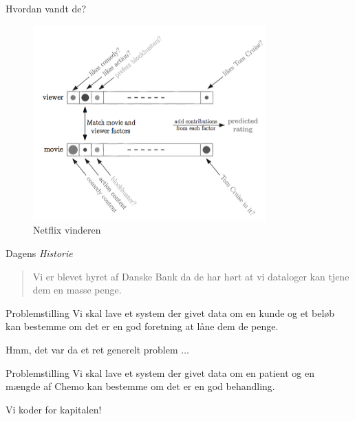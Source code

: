 \documentclass[12pt,t]{beamer}
\begin{document}
    \begin{frame}{Hvordan vandt de?}
        \begin{figure}[h!]
            \caption{Netflix vinderen}
            \centering
            \includegraphics[width=0.8\textwidth]{netflix.png}
        \end{figure}
    \end{frame}

    \begin{frame}[t]{Dagens \emph{Historie}}
        \begin{quote}
            Vi er blevet hyret af Danske Bank da de har hørt at vi dataloger
            kan tjene dem en masse penge.
        \end{quote}
        \pause
        \begin{block}{Problemstilling}
            Vi skal lave et system der givet data om en kunde og et beløb kan
            bestemme om det er en god foretning at låne dem de penge.
        \end{block}
        \pause
        \centering Hmm, det var da et ret generelt problem $\dots$
        \pause
        \begin{block}{Problemstilling}
            Vi skal lave et system der givet data om en \alert{patient} og
            \alert{en mængde af Chemo} kan bestemme om det er en god behandling.
        \end{block}
        \pause
        \centering Vi koder for kapitalen!
    \end{frame}
\end{document}
